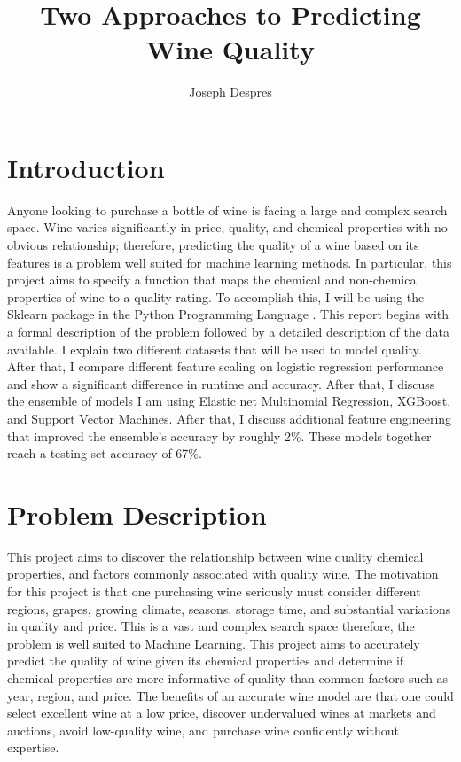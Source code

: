 \documentclass[16pt,twocolumn,letterpaper,titlepage]{article}
\title{Two Approaches to Predicting Wine Quality}
\author{
    Joseph Despres
}
\begin{document}
\maketitle


\onecolumn
\tableofcontents
\thispagestyle{empty}
\newpage
\twocolumn


\setcounter{page}{1}

\section{Introduction}


Anyone looking to purchase a bottle of wine is facing a large and complex search space. Wine varies significantly in price, quality, and chemical properties with no obvious relationship; therefore, predicting the quality of a wine based on its features is a problem well suited for machine learning methods. In particular, this project aims to specify a function that maps the chemical and non-chemical properties of wine to a quality rating. To accomplish this, I will be using the Sklearn package \cite{scikit-learn} in the Python Programming Language \cite{10.5555/1593511}. This report begins with a formal description of the problem followed by a detailed description of the data available. I explain two different datasets that will be used to model quality. After that, I compare different feature scaling on logistic regression performance and show a significant difference in runtime and accuracy. After that, I discuss the ensemble of models I am using Elastic net Multinomial Regression, XGBoost, and Support Vector Machines. After that, I discuss additional feature engineering that improved the ensemble's accuracy by roughly 2\%. These models together reach a testing set accuracy of 67\%.

\section{Problem Description}


This project aims to discover the relationship between wine quality chemical properties, and factors commonly associated with quality wine. The motivation for this project is that one purchasing wine seriously must consider different regions, grapes, growing climate, seasons, storage time, and substantial variations in quality and price. This is a vast and complex search space therefore, the problem is well suited to Machine Learning. This project aims to accurately predict the quality of wine given its chemical properties and determine if chemical properties are more informative of quality than common factors such as year, region, and price. The benefits of an accurate wine model are that one could select excellent wine at a low price, discover undervalued wines at markets and auctions, avoid low-quality wine, and purchase wine confidently without expertise.
\end{document}

